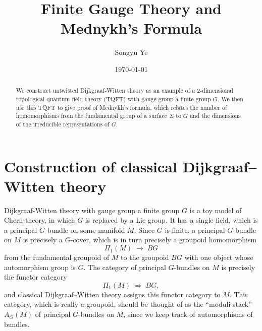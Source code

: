 \documentclass[12pt]{article}
\begin{document}
\rhead{\today}
\cfoot{\thepage}

\title{Finite Gauge Theory and Mednykh's Formula}

\author{Songyu Ye}
\date{\today}
\maketitle


\begin{abstract}
    We construct untwisted Dijkgraaf-Witten theory as an example of a 2-dimensional topological quantum field theory (TQFT) with gauge group a finite group $G$. We then use this TQFT to give proof of Mednykh's formula, which relates the number of homomorphisms from the fundamental group of a surface $\Sigma$ to $G$ and the dimensions of the irreducible representations of $G$.
\end{abstract}

\tableofcontents
\section{Construction of classical Dijkgraaf--Witten theory}
Dijkgraaf-Witten theory with gauge group a finite group $G$ is a toy model of Chern-theory, in which $G$ is replaced by a Lie group. It has a single field, which is a principal $G$-bundle on some manifold $M$. Since $G$ is finite, a principal $G$-bundle on $M$ is precisely a $G$-cover, which is in turn precisely a groupoid homomorphism
\[
    \Pi_1(M) \;\longrightarrow\; BG
    \tag{3}
\]
from the fundamental groupoid of $M$ to the groupoid $BG$ with one object whose automorphism group is $G$. The category of principal $G$-bundles on $M$ is precisely the functor category
\[
    \Pi_1(M) \;\Rightarrow\; BG,
\]
and classical Dijkgraaf--Witten theory assigns this functor category to $M$. This category, which is really a groupoid, should be thought of as the ``moduli stack'' $A_G(M)$ of principal $G$-bundles on $M$, since we keep track of automorphisms of bundles.
\end{document}
